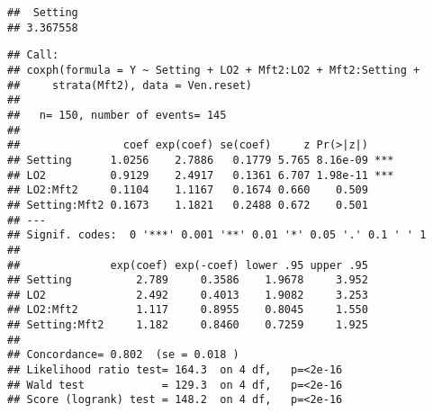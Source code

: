 \documentclass[
]{article}
\newenvironment{Shaded}{\begin{snugshade}}{\end{snugshade}}
\newcommand{\AttributeTok}[1]{\textcolor[rgb]{0.77,0.63,0.00}{#1}}
\newcommand{\CommentTok}[1]{\textcolor[rgb]{0.56,0.35,0.01}{\textit{#1}}}
\newcommand{\DecValTok}[1]{\textcolor[rgb]{0.00,0.00,0.81}{#1}}
\newcommand{\FunctionTok}[1]{\textcolor[rgb]{0.00,0.00,0.00}{#1}}
\newcommand{\NormalTok}[1]{#1}
\newcommand{\OtherTok}[1]{\textcolor[rgb]{0.56,0.35,0.01}{#1}}
\newcommand{\SpecialCharTok}[1]{\textcolor[rgb]{0.00,0.00,0.00}{#1}}
\begin{document}
\begin{verbatim}
##  Setting 
## 3.367558
\end{verbatim}

\begin{Shaded}
\end{Shaded}

\begin{verbatim}
## Call:
## coxph(formula = Y ~ Setting + LO2 + Mft2:LO2 + Mft2:Setting + 
##     strata(Mft2), data = Ven.reset)
## 
##   n= 150, number of events= 145 
## 
##                coef exp(coef) se(coef)     z Pr(>|z|)    
## Setting      1.0256    2.7886   0.1779 5.765 8.16e-09 ***
## LO2          0.9129    2.4917   0.1361 6.707 1.98e-11 ***
## LO2:Mft2     0.1104    1.1167   0.1674 0.660    0.509    
## Setting:Mft2 0.1673    1.1821   0.2488 0.672    0.501    
## ---
## Signif. codes:  0 '***' 0.001 '**' 0.01 '*' 0.05 '.' 0.1 ' ' 1
## 
##              exp(coef) exp(-coef) lower .95 upper .95
## Setting          2.789     0.3586    1.9678     3.952
## LO2              2.492     0.4013    1.9082     3.253
## LO2:Mft2         1.117     0.8955    0.8045     1.550
## Setting:Mft2     1.182     0.8460    0.7259     1.925
## 
## Concordance= 0.802  (se = 0.018 )
## Likelihood ratio test= 164.3  on 4 df,   p=<2e-16
## Wald test            = 129.3  on 4 df,   p=<2e-16
## Score (logrank) test = 148.2  on 4 df,   p=<2e-16
\end{verbatim}

\begin{Shaded}
\end{Shaded}
\end{document}
